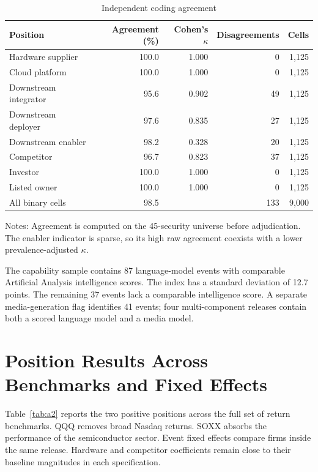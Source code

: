 \documentclass[12pt]{article}
\begin{document}
\begin{table}[H]
\centering
\begin{threeparttable}
\caption{Independent coding agreement}\label{tab:a1}
\small
\begin{tabular}{lrrrr}
\toprule
Position & Agreement (\%) & Cohen's $\kappa$ &
Disagreements & Cells \\
\midrule
Hardware supplier      & 100.0 & 1.000 & 0  & 1,125 \\
Cloud platform         & 100.0 & 1.000 & 0  & 1,125 \\
Downstream integrator  & 95.6  & 0.902 & 49 & 1,125 \\
Downstream deployer    & 97.6  & 0.835 & 27 & 1,125 \\
Downstream enabler     & 98.2  & 0.328 & 20 & 1,125 \\
Competitor             & 96.7  & 0.823 & 37 & 1,125 \\
Investor               & 100.0 & 1.000 & 0  & 1,125 \\
Listed owner           & 100.0 & 1.000 & 0  & 1,125 \\
\midrule
All binary cells       & 98.5  &       & 133 & 9,000 \\
\bottomrule
\end{tabular}
\begin{tablenotes}\footnotesize
\item Notes: Agreement is computed on the 45-security universe before
adjudication. The enabler indicator is sparse, so its high raw agreement
coexists with a lower prevalence-adjusted $\kappa$.
\end{tablenotes}
\end{threeparttable}
\end{table}

The capability sample contains 87 language-model events with comparable
Artificial Analysis intelligence scores. The index has a standard
deviation of 12.7 points. The remaining 37 events lack a comparable
intelligence score. A separate media-generation flag identifies 41 events;
four multi-component releases contain both a scored language model and a
media model.

\section{Position Results Across Benchmarks and Fixed Effects}

Table~\ref{tab:a2} reports the two positive positions across the full set of
return benchmarks. QQQ removes broad Nasdaq returns. SOXX absorbs the
performance of the semiconductor sector. Event fixed effects compare firms
inside the same release. Hardware and competitor coefficients remain close
to their baseline magnitudes in each specification.
\end{document}
